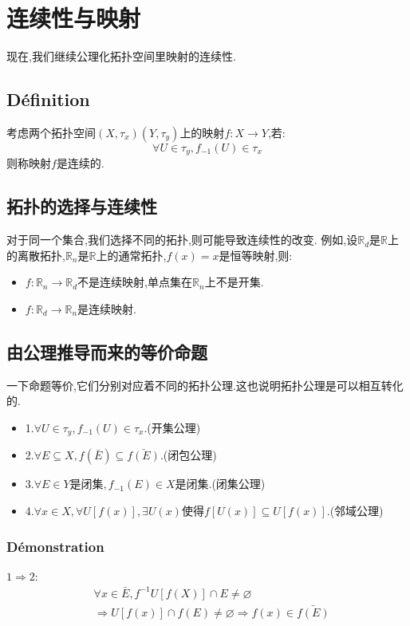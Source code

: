 \documentclass[12pt, a4paper, oneside]{ctexbook}
\newcommand{\R }{\mathbb{R}}%
\begin{document}
\section{连续性与映射}
  现在,我们继续公理化拓扑空间里映射的连续性.
  \subsection{Définition}
  考虑两个拓扑空间$(X,\tau_x)(Y,\tau_y)$上的映射$f:X\rightarrow Y$,若:
  $$
  \forall U\in\tau_y,f_{-1}(U)\in\tau_x
  $$
  则称映射$f$是连续的.
  \subsection{拓扑的选择与连续性}
  对于同一个集合,我们选择不同的拓扑,则可能导致连续性的改变.
  例如,设$\R_d$是$\R$上的离散拓扑,$\R_n$是$\R$上的通常拓扑,$f(x)=x$是恒等映射,则:
  \begin{itemize}
    \item $f:\R_n\rightarrow \R_d$不是连续映射,单点集在$\R_n$上不是开集.
    \item $f:\R_d\rightarrow \R_n$是连续映射.
  \end{itemize}
  \subsection{由公理推导而来的等价命题}
  一下命题等价,它们分别对应着不同的拓扑公理.这也说明拓扑公理是可以相互转化的.
  \begin{itemize}
    \item 1.$\forall U\in\tau_y,f_{-1}(U)\in\tau_x$.(开集公理)
    \item 2.$\forall E\subseteq X,f(\bar{E})\subseteq \bar{f(E)}$.(闭包公理)
    \item 3.$\forall E\in Y\text{是闭集},f_{-1}(E)\in X\text{是闭集}$.(闭集公理)
    \item 4.$\forall x\in X, \forall U[f(x)], \exists U(x)\text{使得}f[U(x)]\subseteq U[f(x)]$.(邻域公理)
  \end{itemize}
  \subsubsection{Démonstration}
  $1\Rightarrow 2$:
  $$
  \begin{aligned}&
    \forall x\in \bar{E},f^{-1}U[f(X)]\cap E\neq\varnothing\\&
    \Rightarrow U[f(x)]\cap f(E)\neq\varnothing\Rightarrow f(x)\in \bar{f(E)}
    \end{aligned}
  $$
\end{document}
